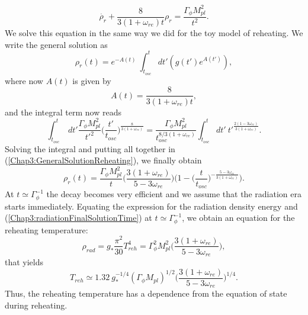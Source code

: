 \documentclass[11pt,a4paper,twoside]{book}
\begin{document}
\begin{equation}
	\label{Chap3:FinalEquationRadiationReheating}
		\dot{\rho_{r}} + \frac{8}{3(1+\omega_{re})t}\rho_{r} = \frac{\Gamma_{\phi} M_{pl}^{2}}{t^{2}}.
\end{equation}
We solve this equation in the same way we did for the toy model of reheating. We write the general solution as
\begin{equation}
	\label{Chap3:GeneralSolutionReheating}
	\rho_{r}(t)=e^{-A(t)}\ \int_{t_{osc}}^{t} dt'(g(t')e^{A(t')}),
\end{equation}
where now $ A(t) $ is given by
\begin{equation}
	\label{Chap3:A(t)Parameter}
	A(t)=\frac{8}{3(1+\omega_{re})t},
\end{equation}
and the integral term now reads
\begin{equation}
	\label{Chap3:IntegralTermReheating}
	\int_{t_{osc}}^{t}\ dt' \frac{\Gamma_{\phi} M_{pl}^{2}}{t'^{2}}\Bigg(\frac{t'}{t_{osc}}\Bigg)^{\frac{8}{3(1+\omega_{re})}}=
	\frac{\Gamma_{\phi} M_{pl}^{2}}{t_{osc}^{8/3(1+\omega_{re})}}\int_{t_{osc}}^{t} dt'\ t'^{\frac{2(1-3\omega_{re})}{3(1+\omega_{re})}}.
\end{equation}
Solving the integral and putting all together in (\ref{Chap3:GeneralSolutionReheating}), we finally obtain
\begin{equation}
	\label{Chap3:radiationFinalSolutionTime}
	\rho_{r}(t)=\frac{\Gamma_{\phi}M_{pl}^{2}}{t}\Bigg(\frac{3(1+\omega_{re})}{5-3\omega_{re}}\Bigg)\Bigg(1-\Bigg(\frac{t}{t_{osc}}\Bigg)^{-\frac{5-3\omega_{re}}{3(1+\omega_{re})}}\Bigg).
\end{equation}
At $ t\simeq \Gamma_{\phi}^{-1} $ the decay becomes very efficient and we assume that the radiation era starts immediately. Equating the expression for the radiation density energy and (\ref{Chap3:radiationFinalSolutionTime}) at $ t \simeq \Gamma_{\phi}^{-1} $, we obtain an equation for the reheating temperature:
\begin{equation}
	\label{Chap3:EquatingRadiationThermalization}
\rho_{rad}=g_{*}\frac{\pi^{2}}{30}T_{reh}^{4}=\Gamma_{\phi}^{2}M_{pl}^{2}\Bigg(\frac{3(1+\omega_{re})}{5-3\omega_{re}}\Bigg),
\end{equation}
that yields
\begin{equation}
	T_{reh} \simeq 1.32\ g_{*}^{-1/4} (\Gamma_{\phi}M_{pl})^{1/2}\Bigg(\frac{3(1+\omega_{re})}{5-3\omega_{re}}\Bigg)^{1/4}.
\end{equation}
Thus, the reheating temperature has a dependence from the equation of state during reheating.
\end{document}
